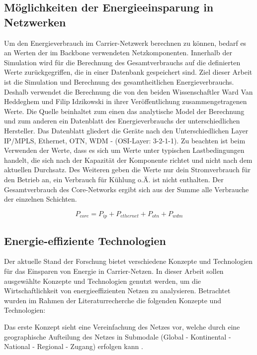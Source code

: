 \documentclass[12pt,titlepage]{article}
\begin{document}
\subsection{Möglichkeiten der Energieeinsparung in Netzwerken}
Um den Energieverbrauch im Carrier-Netzwerk berechnen zu können, bedarf es an Werten der im Backbone verwendeten Netzkomponenten. Innerhalb der Simulation wird für die Berechnung des Gesamtverbrauchs auf die definierten Werte zurückgegriffen, die in einer Datenbank gespeichert sind. Ziel dieser Arbeit ist die Simulation und Berechnung des gesamtheitlichen Energieverbrauchs. Deshalb verwendet die Berechnung die von den beiden Wissenschaftler Ward Van Heddeghem und Filip Idzikowski in ihrer Veröffentlichung \cite{vanhedde} zusammengetragenen Werte. Die Quelle beinhaltet zum einen das analytische Model der Berechnung und zum anderen ein Datenblatt \cite{vanhsheet} des Energieverbrauchs der unterschiedlichen Hersteller. Das Datenblatt gliedert die Geräte nach den Unterschiedlichen Layer IP/MPLS, Ethernet, OTN, WDM - (OSI-Layer: 3-2-1-1). Zu beachten ist beim Verwenden der Werte, dass es sich um Werte unter typischen Lastbedingungen handelt, die sich nach der Kapazität der Komponente richtet und nicht nach dem aktuellen Durchsatz. Des Weiteren geben die Werte nur dein Stromverbrauch für den Betrieb an, ein Verbrauch für Kühlung o.Ä. ist nicht enthalten.
Der Gesamtverbrauch des Core-Networks ergibt sich aus der Summe alle Verbrauche der einzelnen Schichten. 

\begin{equation}
P_{core} = P_{ip} + P_{ethernet} + P_{otn} + P_{wdm}
\end{equation}


\subsection{Energie-effiziente Technologien}
Der aktuelle Stand der Forschung bietet verschiedene Konzepte und Technologien für das Einsparen von Energie in Carrier-Netzen. In dieser Arbeit sollen ausgewählte Konzepte und Technologien genutzt werden, um die Wirtschaftlichkeit von energieeffizienten Netzen zu analysieren. Betrachtet wurden im Rahmen der Literaturrecherche die folgenden Konzepte und Technologien: 

Das erste Konzept sieht eine Vereinfachung des Netzes vor, welche durch eine geographische Aufteilung des Netzes in Submodale (Global - Kontinental - National - Regional - Zugang) erfolgen kann \cite{aleksic2014}.
\end{document}
